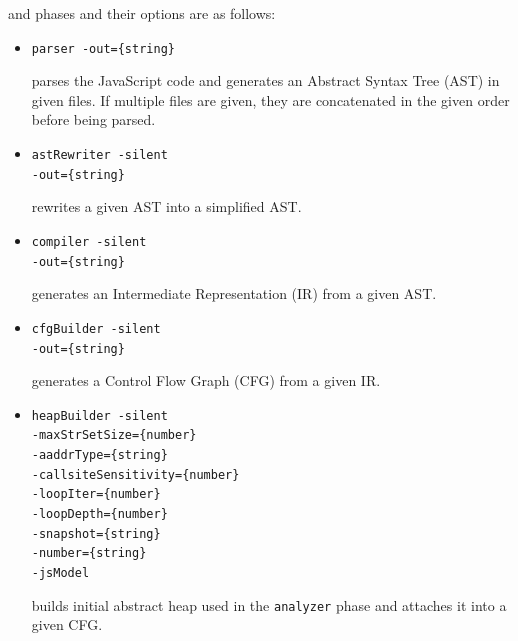 and phases and their options are as follows:
\begin{itemize}
\item \verb!parser -out={string}!

parses the JavaScript code and generates an Abstract Syntax Tree (AST)
in given files. If multiple files are given, they are concatenated
in the given order before being parsed.

\item \verb!astRewriter -silent!\\
\hspace*{6.3em}\verb!-out={string}!

rewrites a given AST into a simplified AST.

\item \verb!compiler -silent!\\
\hspace*{4.7em}\verb!-out={string}!

generates an Intermediate Representation (IR) from a given AST.

\item \verb!cfgBuilder -silent!\\
\hspace*{5.8em}\verb!-out={string}!

generates a Control Flow Graph (CFG) from a given IR.

\item \verb!heapBuilder -silent!\\
\hspace*{6.3em}\verb!-maxStrSetSize={number}!\\
\hspace*{6.3em}\verb!-aaddrType={string}!\\
\hspace*{6.3em}\verb!-callsiteSensitivity={number}!\\
\hspace*{6.3em}\verb!-loopIter={number}!\\
\hspace*{6.3em}\verb!-loopDepth={number}!\\
\hspace*{6.3em}\verb!-snapshot={string}!\\
\hspace*{6.3em}\verb!-number={string}!\\
\hspace*{6.3em}\verb!-jsModel!

builds initial abstract heap used in the \verb!analyzer! phase
and attaches it into a given CFG.


\end{itemize}
